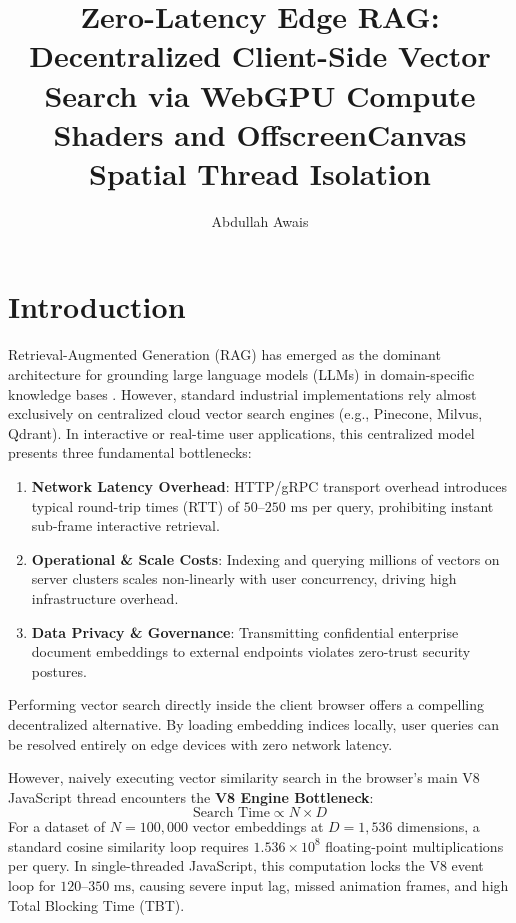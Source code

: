 \documentclass[fleqn,10pt,lineno]{wlpeerj}
\title{Zero-Latency Edge RAG: Decentralized Client-Side Vector Search via WebGPU Compute Shaders and OffscreenCanvas Spatial Thread Isolation}
\author[1]{Abdullah Awais}
\affil[1]{COMSATS University Islamabad, Vehari Campus}
\begin{document}
\flushbottom
\maketitle
\thispagestyle{empty}

\section*{Introduction}

Retrieval-Augmented Generation (RAG) has emerged as the dominant architecture for grounding large language models (LLMs) in domain-specific knowledge bases \citep{lewis2020retrieval}. However, standard industrial implementations rely almost exclusively on centralized cloud vector search engines (e.g., Pinecone, Milvus, Qdrant). In interactive or real-time user applications, this centralized model presents three fundamental bottlenecks:
\begin{enumerate}[noitemsep]
\item \textbf{Network Latency Overhead}: HTTP/gRPC transport overhead introduces typical round-trip times (RTT) of $50\text{--}250\text{ ms}$ per query, prohibiting instant sub-frame interactive retrieval.
\item \textbf{Operational \& Scale Costs}: Indexing and querying millions of vectors on server clusters scales non-linearly with user concurrency, driving high infrastructure overhead.
\item \textbf{Data Privacy \& Governance}: Transmitting confidential enterprise document embeddings to external endpoints violates zero-trust security postures.
\end{enumerate}

Performing vector search directly inside the client browser offers a compelling decentralized alternative. By loading embedding indices locally, user queries can be resolved entirely on edge devices with zero network latency.

However, naively executing vector similarity search in the browser's main V8 JavaScript thread encounters the \textbf{V8 Engine Bottleneck}:
\begin{equation}
\text{Search Time} \propto N \times D
\label{eq:search_time}
\end{equation}
For a dataset of $N = 100,000$ vector embeddings at $D = 1,536$ dimensions, a standard cosine similarity loop requires $1.536 \times 10^8$ floating-point multiplications per query. In single-threaded JavaScript, this computation locks the V8 event loop for $120\text{--}350\text{ ms}$, causing severe input lag, missed animation frames, and high Total Blocking Time (TBT).
\end{document}

